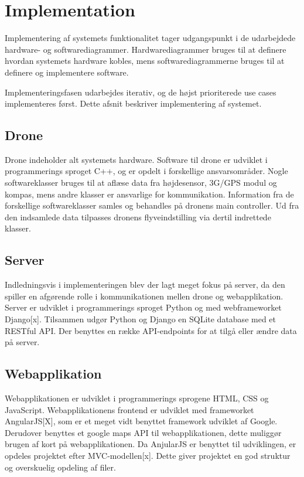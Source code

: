 \chapter{Implementation}
Implementering af systemets funktionalitet tager udgangspunkt i de udarbejdede hardware- og softwarediagrammer. Hardwarediagrammer bruges til at definere hvordan systemets hardware kobles, mens softwarediagrammerne bruges til at definere og implementere software.

Implementeringsfasen udarbejdes iterativ, og de højst prioriterede use cases implementeres først. 
Dette afsnit beskriver implementering af systemet.


\section{Drone}
Drone indeholder alt systemets hardware. Software til drone er udviklet i programmerings sproget C++, og er opdelt i forskellige ansvarsområder. Nogle softwareklasser bruges til at aflæse data fra højdesensor, 3G/GPS modul og kompas, mens andre klasser er ansvarlige for kommunikation. Information fra de forskellige softwareklasser samles og behandles på dronens main controller. Ud fra den indsamlede data tilpasses dronens flyveindstilling via dertil indrettede klasser. 


\section{Server}
Indledningsvis i implementeringen blev der lagt meget fokus på server, da den spiller en afgørende rolle i kommunikationen mellen drone og webapplikation. 
Server er udviklet i programmerings sproget Python og med webframeworket Django[x].
Tilsammen udgør Python og Django en SQLite database med et RESTful API. Der benyttes en række API-endpoints for at tilgå eller ændre data på server.

\section{Webapplikation}
Webapplikationen  er udviklet i programmerings sprogene HTML, CSS og JavaScript. Webapplikationens frontend er udviklet med frameworket AngularJS[X], som er et meget vidt benyttet framework udviklet af Google. Derudover benyttes et google maps API til webapplikationen, dette muliggør brugen af kort på webapplikationen. Da AnjularJS er benyttet til udviklingen, er opdeles projektet efter MVC-modellen[x]. Dette giver projektet en god struktur og overskuelig opdeling af filer.